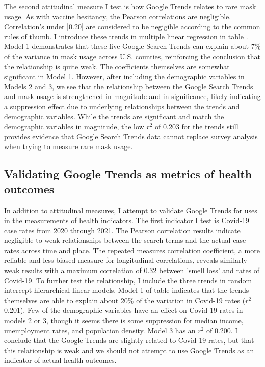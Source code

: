 The second attitudinal measure I test is how Google Trends relates to rare mask
usage. As with vaccine hesitancy, the Pearson correlations are negligible.
Correlation's under |0.20| are considered to be negigible according to the
common rules of thumb. I introduce these trends in multiple linear regression in
table 
. Model 1 demonstrates that these five Google
Search Trends can explain about 7\% of the variance in mask usage across U.S.
counties, reinforcing the conclusion that the relationship is quite weak. The
coefficients themselves are somewhat significant in Model 1. However, after
including the demographic variables in Models 2 and 3, we see that the
relationship between the Google Search Trends and mask usage is strengthened in
magnitude and in significance, likely indicating a suppression effect due to
underlying relationships between the trends and demographic variables. While the
trends are significant and match the demographic variables in magnitude, the
low $r^2$ of 0.203 for the trends still provides evidence that Google Search
Trends data cannot replace survey analysis when trying to measure rare mask
usage.

\subsection{Validating Google Trends as metrics of health outcomes}

In addition to attitudinal measures, I attempt to validate Google Trends for
uses in the measurements of health indicators. The first indicator I test is
Covid-19 case rates from 2020 through 2021. The Pearson correlation results
indicate negligible to weak relationships between the search terms and the
actual case rates across time and place. The repeated measures correlation
coefficient, a more reliable and less biased measure for longitudinal
correlations, reveals similarly weak results with a maximum correlation of 0.32
between 'smell loss' and rates of Covid-19. To further test the relationship, I
include the three trends in random intercept hierarchical linear models. Model 1
of table 
indicates that the trends themselves are able
to explain about 20\% of the variation in Covid-19 rates ($r^2$ = 0.201). Few
of the demographic variables have an effect on Covid-19 rates in models 2 or 3,
though it seems there is some suppression for median income, unemployment rates,
and population density. Model 3 has an $r^2$ of 0.200. I conclude that the
Google Trends are slightly related to Covid-19 rates, but that this relationship
is weak and we should not attempt to use Google Trends as an indicator of actual
health outcomes.

